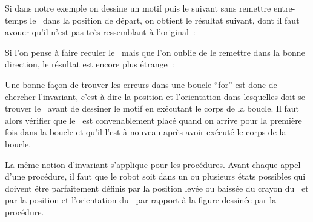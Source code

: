 Si dans notre exemple on dessine un motif puis le suivant sans remettre entre-temps
le \robot\ dans la position de départ, on obtient le résultat suivant, dont
il faut avouer qu'il n'est pas très ressemblant à l'original~:\\[5cm]
%
\vspace*{-5cm}


Si l'on pense à faire reculer le \robot\ mais que l'on oublie de le remettre
dans la bonne direction, le résultat est encore plus étrange~:

\noindent\begin{minipage}{\linewidth}
\vspace*{25mm}
%
\vspace*{-25mm}

\end{minipage}

Une bonne façon de trouver les erreurs dans une boucle ``for'' est donc
de chercher l'invariant, c'est-à-dire la position et l'orientation dans
lesquelles doit se trouver le \robot\ avant de dessiner le motif en
exécutant le corps de la boucle. Il faut alors vérifier que le \robot\ est
convenablement placé quand on arrive pour la première fois dans la boucle
et qu'il l'est à nouveau après avoir exécuté le corps de la boucle.

La même notion d'invariant s'applique pour les procédures. Avant chaque
appel d'une procédure, il faut que le robot soit dans un ou plusieurs
états possibles qui doivent être parfaitement définis par la position
levée ou baissée du crayon du \robot\ et par la position et l'orientation
du \robot\ par rapport à la figure dessinée par la procédure.

